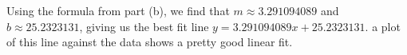 \begin{exercises}
\begin{exerciseSolution}
\item Using the formula from part (b), we find that $m \approx 3.291094089$ and $b \approx 25.2323131$, giving us the best fit line $y = 3.291094089x + 25.2323131$. a plot of this line against the data shows a pretty good linear fit. 

\ea
\end{exerciseSolution}


\end{exercises}
\afterexercises
